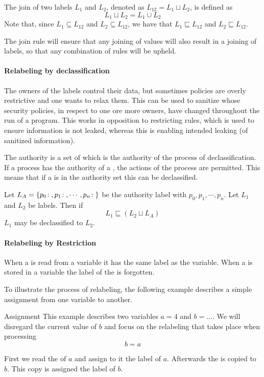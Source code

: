 \begin{definition}
  The join of two labels $L_1$ and $L_2$, denoted as $L_{12} = L_1 \sqcup L_2$, is defined as
  $$L_1 \sqcup L_2 = L_1 \cup L_2$$
  Note that, since $L_1 \subseteq L_{12}$ and $L_2 \subseteq L_{12}$, we have that $L_1 \sqsubseteq L_{12}$ and $L_2 \sqsubseteq L_{12}$.
\end{definition}

The join rule will ensure that any joining of values will also result in a joining of labels, so that any combination of rules will be upheld.

\paragraph{Relabeling by declassification}
The owners of the labels control their data, but sometimes policies are overly restrictive and one wants to relax them.
This can be used to sanitize \xvalues{} whose security policies, in respect to one ore more owners, have changed throughout the run of a program.
This works in opposition to restricting rules, which is used to ensure information is not leaked, whereas this is enabling intended leaking (of sanitized information).

The authority is a set of \principals{} which is the authority of the process of declassification.
If a process has the authority of a \principal{}, the actions of the process are permitted.
This means that if a \principal{} is in the authority set this can be declassified.

\begin{definition}
  Let $L_A = \{p_0\!:\;, p_1\!:\;, \cdots, p_n\!:\;\}$ be the authority label with \principals{} $p_0, p_1, \cdots, p_n$.
  Let $L_1$ and $L_2$ be labels.
  Then if $$L_1 \sqsubseteq (L_2 \sqcup L_A)$$
  $L_1$ may be declassified to $L_2$.
\end{definition}

\paragraph{Relabeling by Restriction}
When a \xvalue{} is read from a variable it has the same label as the variable.
When a \xvalue{} is stored in a variable the label of the \xvalue{} is forgotten.

To illustrate the process of relabeling, the following example describes a simple assignment from one variable to another.

\begin{example}{Assignment}
  This example describes two variables $a = 4$ and $b = ...$.
  We will disregard the current value of $b$ and focus on the relabeling that takes place when processing $$b = a$$

  First we read the \xvalue{} of $a$ and assign to it the label of $a$.
  Afterwards the \xvalue{} is copied to $b$.
  This copy is assigned the label of $b$.
\end{example}

